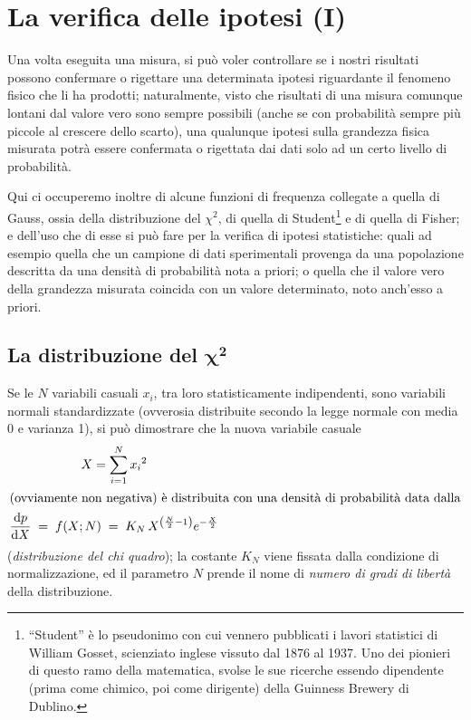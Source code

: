 
\chapter{La verifica delle ipotesi (I)}%
\label{ch:12.veripo}
Una volta eseguita una misura, si pu\`o voler controllare se
i nostri risultati possono confermare o rigettare una
determinata ipotesi riguardante il fenomeno fisico che li ha
prodotti; naturalmente, visto che risultati di una misura
comunque lontani dal valore vero sono sempre possibili
(anche se con probabilit\`a sempre pi\`u piccole al crescere
dello scarto), una qualunque ipotesi sulla grandezza fisica
misurata potr\`a essere confermata o rigettata dai dati solo
ad un certo livello di probabilit\`a.

Qui ci occuperemo inoltre di alcune funzioni di frequenza
collegate a quella di Gauss, ossia della distribuzione del
$\chi^2$, di quella di Student\/\footnote{``Student'' \`e lo
  pseudonimo con cui vennero pubblicati i lavori statistici
  di William Gosset, scienziato inglese vissuto dal 1876 al
  1937.  Uno dei pionieri di questo ramo della matematica,
  svolse le sue ricerche essendo dipendente (prima come
  chimico, poi come dirigente) della Guinness Brewery di
  Dublino.}%
%
e di quella di Fisher; e dell'uso che di esse si pu\`o fare
per la verifica di ipotesi statistiche: quali ad esempio
quella che un campione di dati sperimentali provenga da una
popolazione descritta da una densit\`a di probabilit\`a nota
a priori; o quella che il valore vero della grandezza
misurata coincida con un valore determinato, noto anch'esso
a priori.

\section[La distribuzione del $\chi^2$]
{La distribuzione del
  $\boldsymbol{\chi}^{\boldsymbol{2}}$}%
Se le $N$ variabili casuali $x_i$, tra loro statisticamente
indipendenti, sono variabili normali standardizzate
(ovverosia distribuite secondo la legge normale con media 0
e varianza 1), si pu\`o dimostrare che la nuova variabile
casuale
\begin{gather}
  X = \sum_{i=1}^N {x_i}^2 \notag \\
  \intertext{(ovviamente non negativa) \`e
    distribuita con una densit\`a di probabilit\`a
    data dalla}
  \frac{\mathrm{d} p}{\mathrm{d} X} \; = \; f(X ; N) \; = \;
    K_N \, X^{\left(\frac{N}{2}-1 \right)}
    e^{-\frac{X}{2}} \label{eq:12.denchi}
\end{gather}
(\emph{distribuzione del chi quadro}); la costante $K_N$
viene fissata dalla condizione di normalizzazione, ed il
parametro $N$ prende il nome di \emph{numero di gradi di
  libert\`a} della distribuzione.

